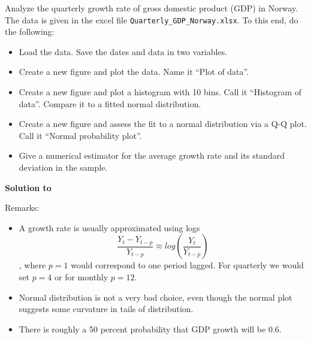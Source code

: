 Analyze the quarterly growth rate of gross domestic product (GDP) in Norway. The data is given in the excel file \texttt{Quarterly\_GDP\_Norway.xlsx}. To this end, do the following:
\begin{itemize}
    \item Load the data. Save the dates and data in two variables.
    \item Create a new figure and plot the data. Name it \enquote{Plot of data}.
    \item Create a new figure and plot a histogram with 10 bins. Call it \enquote{Histogram of data}. Compare it to a fitted normal distribution.
    \item Create a new figure and assess the fit to a normal distribution via a Q-Q plot. Call it \enquote{Normal probability plot}.
    \item Give a numerical estimator for the average growth rate and its standard deviation in the sample.
\end{itemize}
\begin{solution}\textbf{Solution to }
    
    Remarks:
    \begin{itemize}
        \item A growth rate is usually approximated using logs $$\frac{Y_t - Y_{t-p}}{Y_{t-p}} \approx log \left(\frac{Y_t}{Y_{t-p}}\right)$$, where $p=1$ would correspond to one period lagged. For quarterly we would set $p=4$ or for monthly $p=12$.
        \item Normal distribution is not a very bad choice, even though the normal plot suggests some curvature in tails of distribution.
        \item There is roughly a 50 percent probability that GDP growth will be 0.6.
    \end{itemize}
    \newpage
\end{solution}
